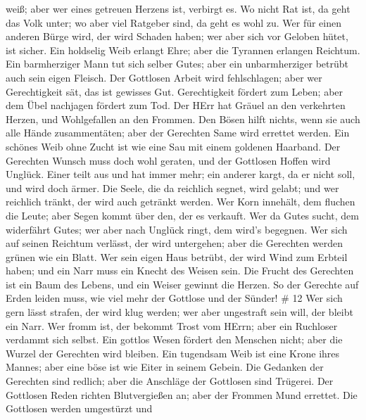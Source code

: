 weiß; aber wer eines getreuen Herzens ist, verbirgt es.  Wo
nicht Rat ist, da geht das Volk unter; wo aber viel Ratgeber sind, da
geht es wohl zu.  Wer für einen anderen Bürge wird, der
wird Schaden haben; wer aber sich vor Geloben hütet, ist sicher.
 Ein holdselig Weib erlangt Ehre; aber die Tyrannen
erlangen Reichtum.  Ein barmherziger Mann tut sich selber
Gutes; aber ein unbarmherziger betrübt auch sein eigen Fleisch.
 Der Gottlosen Arbeit wird fehlschlagen; aber wer
Gerechtigkeit sät, das ist gewisses Gut.  Gerechtigkeit
fördert zum Leben; aber dem Übel nachjagen fördert zum Tod.
 Der HErr hat Gräuel an den verkehrten Herzen, und
Wohlgefallen an den Frommen.  Den Bösen hilft nichts, wenn
sie auch alle Hände zusammentäten; aber der Gerechten Same wird errettet
werden.  Ein schönes Weib ohne Zucht ist wie eine Sau mit
einem goldenen Haarband.  Der Gerechten Wunsch muss doch
wohl geraten, und der Gottlosen Hoffen wird Unglück.  Einer
teilt aus und hat immer mehr; ein anderer kargt, da er nicht soll, und
wird doch ärmer.  Die Seele, die da reichlich segnet, wird
gelabt; und wer reichlich tränkt, der wird auch getränkt werden.
 Wer Korn innehält, dem fluchen die Leute; aber Segen kommt
über den, der es verkauft.  Wer da Gutes sucht, dem
widerfährt Gutes; wer aber nach Unglück ringt, dem wird's begegnen.
 Wer sich auf seinen Reichtum verlässt, der wird
untergehen; aber die Gerechten werden grünen wie ein Blatt.
 Wer sein eigen Haus betrübt, der wird Wind zum Erbteil
haben; und ein Narr muss ein Knecht des Weisen sein.  Die
Frucht des Gerechten ist ein Baum des Lebens, und ein Weiser gewinnt die
Herzen.  So der Gerechte auf Erden leiden muss, wie viel
mehr der Gottlose und der Sünder! \# 12  Wer sich gern lässt
strafen, der wird klug werden; wer aber ungestraft sein will, der bleibt
ein Narr.  Wer fromm ist, der bekommt Trost vom HErrn; aber
ein Ruchloser verdammt sich selbst.  Ein gottlos Wesen
fördert den Menschen nicht; aber die Wurzel der Gerechten wird bleiben.
 Ein tugendsam Weib ist eine Krone ihres Mannes; aber eine
böse ist wie Eiter in seinem Gebein.  Die Gedanken der
Gerechten sind redlich; aber die Anschläge der Gottlosen sind Trügerei.
 Der Gottlosen Reden richten Blutvergießen an; aber der
Frommen Mund errettet.  Die Gottlosen werden umgestürzt und
